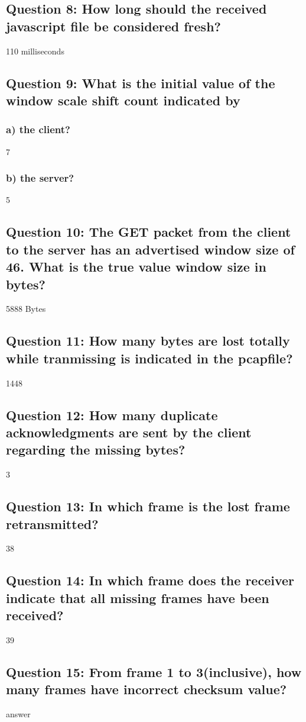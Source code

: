 \documentclass[11pt, oneside, a4paper]{article}
\begin{document}
\subsection*{Question 8: How long should the received javascript file be considered fresh?}
110 milliseconds

\subsection*{Question 9: What is the initial value of the window scale shift count indicated by}
    \subsubsection*{a) the client?}
    7

    \subsubsection*{b) the server?}
    5

\subsection*{Question 10: The GET packet from the client to the server has an advertised window size of 46. What is the true value window size in bytes?}
5888 Bytes

\subsection*{Question 11: How many bytes are lost totally while tranmissing is indicated in the pcapfile?}
1448

\subsection*{Question 12: How  many  duplicate  acknowledgments  are  sent  by  the  client  regarding the missing bytes?}
3

\subsection*{Question 13: In which frame is the lost frame retransmitted?}
38

\subsection*{Question 14: In  which  frame  does  the  receiver  indicate  that all  missing  frames  have  been received?}
39

\subsection*{Question 15: From frame 1 to 3(inclusive), how many frames have incorrect checksum value?}
answer
\end{document}

